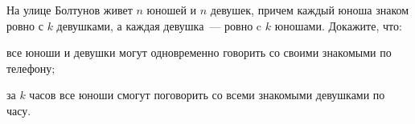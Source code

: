 На улице Болтунов живет $n$ юношей и $n$ девушек, причем каждый юноша знаком ровно с $k$ девушками, а
каждая девушка~--- ровно c $k$ юношами. Докажите, что:
\begin{enumcyr}
    \item все юноши и девушки могут одновременно говорить со своими знакомыми по телефону;
    \item за $k$ часов все юноши смогут поговорить со всеми знакомыми девушками по часу.
\end{enumcyr}